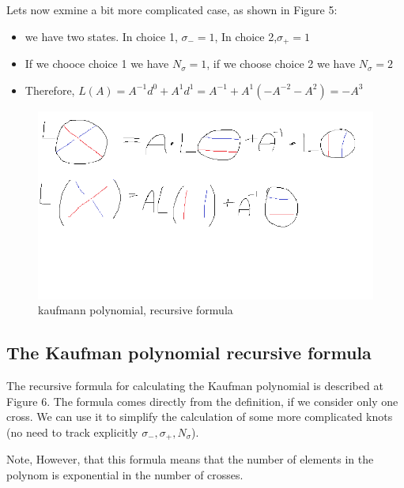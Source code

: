 \documentclass{article}
\begin{document}
Lets now exmine a bit more complicated case, as shown in Figure 5:
\begin{itemize}
    \item we have two states. In choice 1, $\sigma_{-}=1$, In choice 2,$\sigma_{+}=1$
    \item If we chooce choice 1 we have \(N_{\sigma} = 1\), if we choose choice 2 we have \(N_{\sigma} = 2\)
    \item Therefore, $L(A) = A^{-1}d^{0} + A^{1}d^{1} = A^{-1} +A^{1}(-A^{-2}-A^{2}) = -A^{3}$
\end{itemize}

\begin{figure}
\includegraphics[scale=0.2]{kauffman_bracket_identity} 
\caption{kaufmann polynomial, recursive formula}
\end{figure}

\subsection{The Kaufman polynomial recursive formula}

The recursive formula for calculating the Kaufman polynomial is described at Figure 6.
The formula comes directly from the definition, if we consider only one cross. We can use it to simplify the calculation of some more complicated knots (no need to track explicitly  $\sigma_{-}, \sigma_{+}, N_{\sigma}$).

Note, However, that this formula means that the number of elements in the polynom is exponential in the number of crosses.
\end{document}
